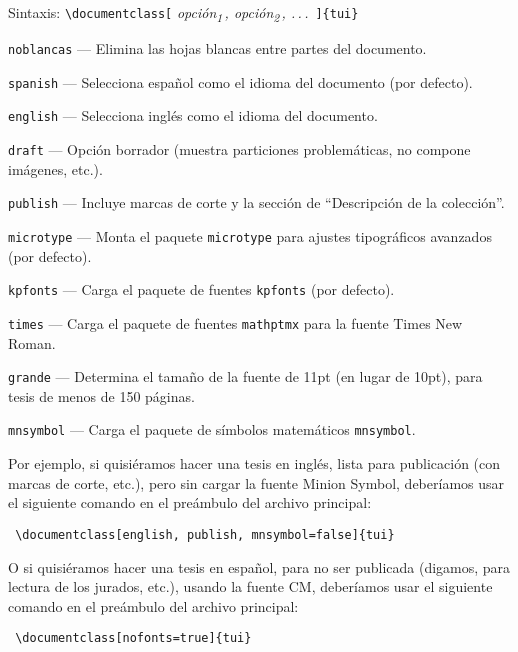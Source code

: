 \documentclass[11pt,
              article,
              oneside
              ]{memoir}
\begin{document}
\medskip\noindent
Sintaxis: \verb+\documentclass[+%
  \textit{\color{DarkRed}opción\textsubscript{1}\,\color{NavyBlue}, \color{DarkRed}opción\textsubscript{2}\color{NavyBlue}\,, .\,.\,.\,}%
  \verb+]{tui}+

\medskip  

\begin{compactenum}
  \item \texttt{noblancas} --- Elimina las hojas blancas entre partes del documento.
  \item \texttt{spanish} --- Selecciona español como el idioma del documento (por defecto).
  \item \texttt{english} --- Selecciona inglés como el idioma del documento.
  \item \texttt{draft} --- Opción borrador (muestra particiones problemáticas, no compone imágenes, etc.).
  \item \texttt{publish} --- Incluye marcas de corte y la sección de \enquote{Descripción de la colección}.
  \item \texttt{microtype} --- Monta el paquete \texttt{microtype} para ajustes tipográficos avanzados (por defecto).
  \item \texttt{kpfonts} --- Carga el paquete de fuentes \texttt{kpfonts} (por defecto).
  \item \texttt{times} --- Carga el paquete de fuentes \texttt{mathptmx} para la fuente Times New Roman.
  \item \texttt{grande} --- Determina el tamaño de la fuente de 11pt (en lugar de 10pt), para tesis de menos de 150 páginas.
  \item \texttt{mnsymbol} --- Carga el paquete de símbolos matemáticos \texttt{mnsymbol}.
\end{compactenum}

\medskip\noindent
Por ejemplo, si quisiéramos hacer una tesis en inglés, lista para publicación (con marcas de corte, etc.), pero sin cargar la fuente Minion Symbol, deberíamos usar el siguiente comando en el preámbulo del archivo principal:

\bigskip\noindent
\verb+ \documentclass[english, publish, mnsymbol=false]{tui} +

\bigskip\noindent
O si quisiéramos hacer una tesis en español, para no ser publicada (digamos, para lectura de los jurados, etc.), usando la fuente CM, deberíamos usar el siguiente comando en el preámbulo del archivo principal:

\bigskip\noindent
\verb+ \documentclass[nofonts=true]{tui} +
\end{document}

